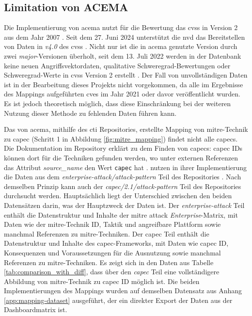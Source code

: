 \subsection{Limitation von ACEMA}
\label{limitationen-acema}
Die Implementierung von \gls{acema} nutzt für die Bewertung das \gls{cvss} in Version 2 aus dem Jahr 2007 \autocite{Acema_oranOCloud_Data_GatheringpyMaster}. Seit dem 27. Juni 2024 unterstützt die \gls{nvd} das Bereitstellen von Daten in \textit{v4.0} des \gls{cvss} \autocite{NVDCVSSV40}. Nicht nur ist die in \gls{acema} genutzte Version durch zwei \textit{major}-Versionen überholt, seit dem 13. Juli 2022 werden in der Datenbank keine neuen Angriffsvektordaten, qualitative Schweregrad-Bewertungen oder Schweregrad-Werte in \gls{cvss} Version 2 erstellt \autocite{RetirementCVSSV2}. Der Fall von unvollständigen Daten ist in der Bearbeitung dieses Projekts nicht vorgekommen, da alle im Ergebnisse des Mappings aufgeführten \glspl{cve} im Jahr 2021 oder davor veröffentlicht wurden. Es ist jedoch theoretisch möglich, dass diese Einschränkung bei der weiteren Nutzung dieser Methode zu fehlenden Daten führen kann.
%
\par Das von \gls{acema}, mithilfe des \gls{cti} Repositories, erstellte Mapping von \gls{mitre}-Technik zu \gls{capec} (Schritt 1 in Abbildung \ref{fig:mitre_mapping}) findet nicht alle \glspl{capec}. Die Dokumentation im Repository erklärt zu dem Finden von \glspl{capec}: \gls{capec} IDs können dort für die Techniken gefunden werden, wo unter externen Referenzen das Attribut \textit{source\_name} den Wert \verb|capec| hat \autocite{CtiUSAGEmdMaster} \autocite{CtiUSAGECAPECmdMaster}. \citeauthor{klementSecuring6GTransition2024} nutzen in ihrer Implementierung die Daten aus dem \textit{enterprise-attack/attack-pattern} Teil des Repositories \autocite{klement2023acema}. Nach demselben Prinzip kann auch der \textit{capec/2.1/attack-pattern} Teil des Repositories durchsucht werden. Hauptsächlich liegt der Unterschied zwischen den beiden Datensätzen darin, was der Hauptzweck der Daten ist. Der \textit{enterprise-attack} Teil enthält die Datenstruktur und Inhalte der \gls{mitre} \gls{attack} \textit{Enterprise}-Matrix, mit Daten wie der \gls{mitre}-Technik ID, Taktik und angreifbare Plattform sowie manchmal Referenzen zu \gls{mitre}-Techniken. Der \gls{capec} Teil enthält die Datenstruktur und Inhalte des \gls{capec}-Frameworks, mit Daten wie \gls{capec} ID, Konsequenzen und Voraussetzungen für die Ausnutzung sowie manchmal Referenzen zu \gls{mitre}-Techniken. Es zeigt sich in den Daten aus Tabelle \ref{tab:comparison_with_diff}, dass über den \textit{\gls{capec}} Teil eine vollständigere Abbildung von \gls{mitre}-Technik zu \gls{capec} ID möglich ist. Die beiden Implementierungen des Mappings wurden auf demselben Datensatz aus Anhang \ref{app:mapping-dataset} ausgeführt, der ein direkter Export der Daten aus der Dashboardmatrix ist.
%

